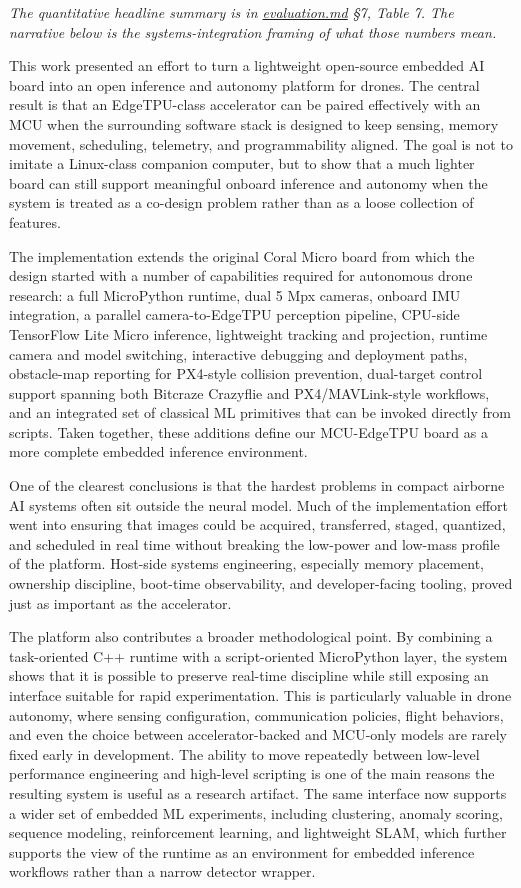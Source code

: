 \emph{The quantitative headline summary is in \url{evaluation.md} §7,
Table 7. The narrative below is the systems-integration framing of what
those numbers mean.}

This work presented an effort to turn a lightweight open-source embedded
AI board into an open inference and autonomy platform for drones. The
central result is that an EdgeTPU-class accelerator can be paired
effectively with an MCU when the surrounding software stack is designed
to keep sensing, memory movement, scheduling, telemetry, and
programmability aligned. The goal is not to imitate a Linux-class
companion computer, but to show that a much lighter board can still
support meaningful onboard inference and autonomy when the system is
treated as a co-design problem rather than as a loose collection of
features.

The implementation extends the original Coral Micro board from which the
design started with a number of capabilities required for autonomous
drone research: a full MicroPython runtime, dual 5 Mpx cameras, onboard
IMU integration, a parallel camera-to-EdgeTPU perception pipeline,
CPU-side TensorFlow Lite Micro inference, lightweight tracking and
projection, runtime camera and model switching, interactive debugging
and deployment paths, obstacle-map reporting for PX4-style collision
prevention, dual-target control support spanning both Bitcraze Crazyflie
and PX4/MAVLink-style workflows, and an integrated set of classical ML
primitives that can be invoked directly from scripts. Taken together,
these additions define our MCU-EdgeTPU board as a more complete embedded
inference environment.

One of the clearest conclusions is that the hardest problems in compact
airborne AI systems often sit outside the neural model. Much of the
implementation effort went into ensuring that images could be acquired,
transferred, staged, quantized, and scheduled in real time without
breaking the low-power and low-mass profile of the platform. Host-side
systems engineering, especially memory placement, ownership discipline,
boot-time observability, and developer-facing tooling, proved just as
important as the accelerator.

The platform also contributes a broader methodological point. By
combining a task-oriented C++ runtime with a script-oriented MicroPython
layer, the system shows that it is possible to preserve real-time
discipline while still exposing an interface suitable for rapid
experimentation. This is particularly valuable in drone autonomy, where
sensing configuration, communication policies, flight behaviors, and
even the choice between accelerator-backed and MCU-only models are
rarely fixed early in development. The ability to move repeatedly
between low-level performance engineering and high-level scripting is
one of the main reasons the resulting system is useful as a research
artifact. The same interface now supports a wider set of embedded ML
experiments, including clustering, anomaly scoring, sequence modeling,
reinforcement learning, and lightweight SLAM, which further supports the
view of the runtime as an environment for embedded inference workflows
rather than a narrow detector wrapper.

